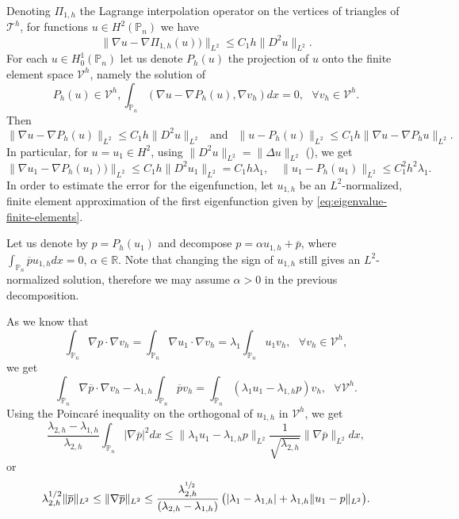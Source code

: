 \documentclass[11pt]{article}
\numberwithin{equation}{section}\newtheorem*{jepEnonce}{\jepEnonceTitle}\newenvironment{enonce*}[1]{\def\jepEnonceTitle{#1}\jepEnonce}{\endjepEnonce}\newtheorem*{conj*}{Conjecture}
\theoremstyle{plain}
\theoremstyle{definition}
\def\R{\mathbb{R}}
\def\Pp{{\mathbb{P}_n}}
\newcommand{\lb}{\lambda}
\let\jepOriginalSfrac\sfrac
\renewcommand{\sfrac}[2]{{\jepOriginalSfrac{#1}{#2}}}
\begin{document}
Denoting $\Pi_{1,h}$ the Lagrange interpolation operator on the vertices of triangles of~${\mathcal T}^h$, for functions $u \in H^2(\Pp)$ we have
\[
\|\nabla u-\nabla \Pi_{1,h} (u)) \|_{L^2} \le C_1 h \|D^2 u\|_{L^2}.
\]
For each $u \in H^1_0(\Pp)$ let us denote $P_h(u)$ the projection of $u$ onto the finite element space $\mathcal V^h$, namely the solution of
\begin{equation}
P_h(u) \in \mathcal V^h, \int_{\Pp} (\nabla u- \nabla P_h(u), \nabla v_h)dx =0,\ \ \ \forall v_h \in \mathcal V^h.
\label{eq:projection-h}
\end{equation}
Then
\begin{equation}\label{eq:u-phu}
\|\nabla u- \nabla P_h(u) \|_{L^2} \le C_1 h \|D^2 u\|_{L^2} \ \ \text{ and } \ \ \|u-P_h(u)\|_{L^2} \leq C_1h \|\nabla u- \nabla P_hu\|_{L^2}.
\end{equation}
In particular, for $u = u_1 \in H^2$, using $\|D^2u\|_{L^2} = \|\Delta u\|_{L^2}$ (\cite[Th.\,4.3.1.4]{grisvard}), we get
\begin{equation}\label{eq:error_xuefeng}
\|\nabla u_1-\nabla P_h(u_1)) \|_{L^2} \le C_1 h \|D^2 u_1\|_{L^2} = C_1 h\lambda_1,\quad \|u_1-P_h(u_1)\|_{L^2} \leq C_1^2h^2 \lambda_1.
\end{equation}
In order to estimate the error for the eigenfunction, let $u_{1,h}$ be an $L^2$-normalized, finite element approximation of the first eigenfunction given by \eqref{eq:eigenvalue-finite-elements}.

Let us denote by $p= P_h(u_1)$ and decompose $p= \alpha u_{1,h}+ \overline p$, where $\int_ {\Pp} \overline p u_{1,h} dx =0$, $\alpha \in \R$. Note that changing the sign of $u_{1,h}$ still gives an $L^2$-normalized solution, therefore we may assume $\alpha>0$ in the previous decomposition.

As we know that
\[
\int_\Pp \nabla p \cdot \nabla v_h = \int_\Pp \nabla u_1 \cdot \nabla v_h = \lambda_1\int_\Pp u_1v_h, \ \ \ \forall v_h \in \mathcal V^h,
\]
we get
\[
\int_\Pp \nabla \overline p \cdot \nabla v_h - \lambda_{1,h} \int_\Pp \overline p v_h = \int_{\Pp} (\lb_1 u_1- \lb_{1, h}p)v_h, \ \ \ \forall \mathcal V^h.
\]
Using the Poincaré inequality on the orthogonal of $u_{1,h}$ in $\mathcal V^h$, we get
\[
\frac{\lambda_{2,h}-\lambda_{1,h}}{\lambda_{2,h}}\int_{\Pp} |\nabla \overline p|^2 dx \le \| \lb_1 u_1- \lb_{1, h}p\|_{L^2} \frac{1}{\sqrt{\lambda_{2,h}}} \|\nabla \overline p\|_{L^2} dx,
\]
or
\begin{equation}
\lambda_{2,h}^{1/2}\|\overline p\|_{L^2} \leq \|\nabla \overline p \|_{L^2} \le \frac{\lb_{2, h}^{\sfrac 12}}{(\lb_{2, h}-\lb_{1, h})}\,\big (|\lb_1-\lb_{1, h}|+ \lb_{1, h}\|u_1- p\|_{L^2}\big).
\label{eq:estimate-p-bar}
\end{equation}
\end{document}
